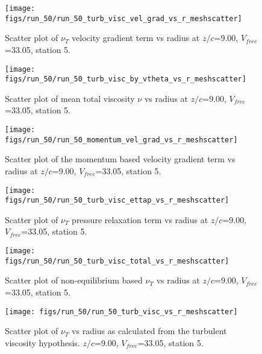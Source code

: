 \begin{figure}[H]
\centering
\texttt{[image: figs/run\_50/run\_50\_turb\_visc\_vel\_grad\_vs\_r\_meshscatter]}
\caption{Scatter plot of $\nu_T$ velocity gradient term vs radius at $z/c$=9.00, $V_{free}$=33.05, station 5.}
\end{figure}


\begin{figure}[H]
\centering
\texttt{[image: figs/run\_50/run\_50\_turb\_visc\_by\_vtheta\_vs\_r\_meshscatter]}
\caption{Scatter plot of mean total viscosity $\nu$ vs radius at $z/c$=9.00, $V_{free}$=33.05, station 5.}
\end{figure}


\begin{figure}[H]
\centering
\texttt{[image: figs/run\_50/run\_50\_momentum\_vel\_grad\_vs\_r\_meshscatter]}
\caption{Scatter plot of the momentum based velocity gradient term vs radius at $z/c$=9.00, $V_{free}$=33.05, station 5.}
\end{figure}


\begin{figure}[H]
\centering
\texttt{[image: figs/run\_50/run\_50\_turb\_visc\_ettap\_vs\_r\_meshscatter]}
\caption{Scatter plot of $\nu_T$ pressure relaxation term vs radius at $z/c$=9.00, $V_{free}$=33.05, station 5.}
\end{figure}


\begin{figure}[H]
\centering
\texttt{[image: figs/run\_50/run\_50\_turb\_visc\_total\_vs\_r\_meshscatter]}
\caption{Scatter plot of non-equilibrium based $\nu_T$ vs radius at $z/c$=9.00, $V_{free}$=33.05, station 5.}
\end{figure}


\begin{figure}[H]
\centering
\texttt{[image: figs/run\_50/run\_50\_turb\_visc\_vs\_r\_meshscatter]}
\caption{Scatter plot of $\nu_T$ vs radius as calculated from the turbulent viscosity hypothesis. $z/c$=9.00, $V_{free}$=33.05, station 5.}
\end{figure}


